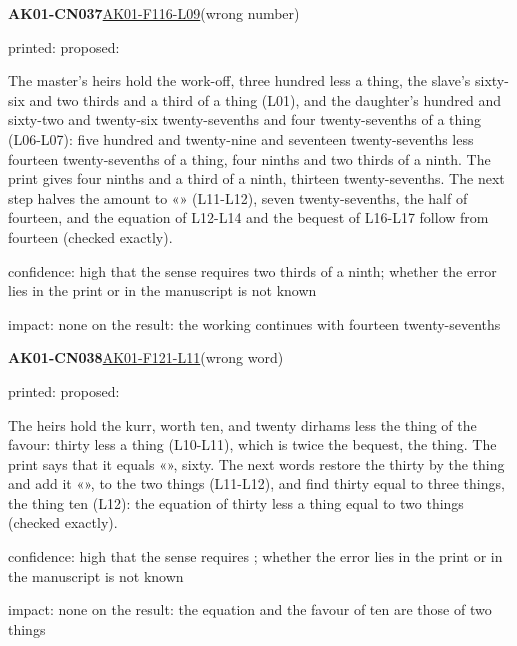 \documentclass[11pt]{article}
\begin{document}
\noindent\textbf{AK01-CN037}\enspace\hyperlink{AK01-F116-L09}{AK01-F116-L09}\enspace(wrong number)\par\noindent printed: \enspace proposed: \par\noindent The master's heirs hold the work-off, three hundred less a thing, the slave's sixty-six and two thirds and a third of a thing (L01), and the daughter's hundred and sixty-two and twenty-six twenty-sevenths and four twenty-sevenths of a thing (L06-L07): five hundred and twenty-nine and seventeen twenty-sevenths less fourteen twenty-sevenths of a thing, four ninths and two thirds of a ninth. The print gives four ninths and a third of a ninth, thirteen twenty-sevenths. The next step halves the amount to «» (L11-L12), seven twenty-sevenths, the half of fourteen, and the equation of L12-L14 and the bequest of L16-L17 follow from fourteen (checked exactly).\par\noindent confidence: high that the sense requires two thirds of a ninth; whether the error lies in the print or in the manuscript is not known\par\noindent impact: none on the result: the working continues with fourteen twenty-sevenths\par\medskip
\noindent\textbf{AK01-CN038}\enspace\hyperlink{AK01-F121-L11}{AK01-F121-L11}\enspace(wrong word)\par\noindent printed: \enspace proposed: \par\noindent The heirs hold the kurr, worth ten, and twenty dirhams less the thing of the favour: thirty less a thing (L10-L11), which is twice the bequest, the thing. The print says that it equals «», sixty. The next words restore the thirty by the thing and add it «», to the two things (L11-L12), and find thirty equal to three things, the thing ten (L12): the equation of thirty less a thing equal to two things (checked exactly).\par\noindent confidence: high that the sense requires ; whether the error lies in the print or in the manuscript is not known\par\noindent impact: none on the result: the equation and the favour of ten are those of two things\par\medskip
\end{document}
